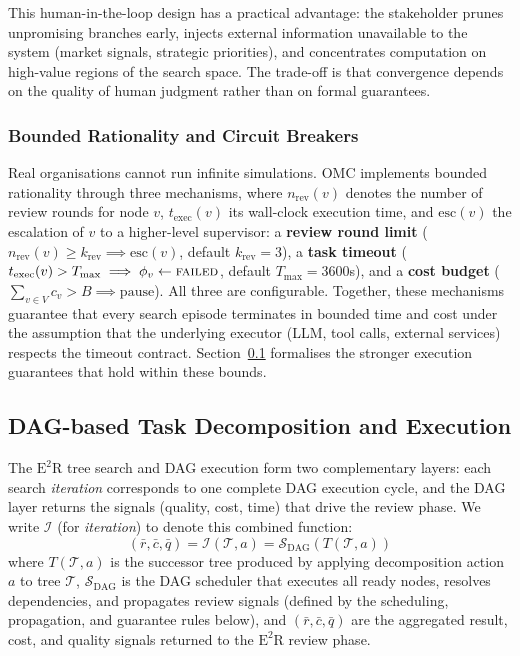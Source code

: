 \documentclass[11pt,a4paper]{article}
\begin{document}
This human-in-the-loop design has a practical advantage: the stakeholder prunes unpromising branches early, injects external information unavailable to the system (market signals, strategic priorities), and concentrates computation on high-value regions of the search space. The trade-off is that convergence depends on the quality of human judgment rather than on formal guarantees.

\subsubsection{Bounded Rationality and Circuit Breakers}

Real organisations cannot run infinite simulations.  OMC implements bounded rationality through three mechanisms, where $n_{\text{rev}}(v)$ denotes the number of review rounds for node $v$, $t_{\text{exec}}(v)$ its wall-clock execution time, and $\text{esc}(v)$ the escalation of $v$ to a higher-level supervisor: a \textbf{review round limit} ($n_{\text{rev}}(v) \geq k_{\text{rev}} \implies \text{esc}(v)$, default $k_{\text{rev}} = 3$), a \textbf{task timeout} ($t_{\text{exec}}(v) > T_{\max} \implies \phi_v \leftarrow \textsc{failed}$, default $T_{\max} = 3600$s), and a \textbf{cost budget} ($\sum_{v \in V} c_v > B \implies \text{pause}$).  All three are configurable.  Together, these mechanisms guarantee that every search episode terminates in bounded time and cost under the assumption that the underlying executor (LLM, tool calls, external services) respects the timeout contract.  Section~\ref{sec:dag} formalises the stronger execution guarantees that hold within these bounds.


\subsection{DAG-based Task Decomposition and Execution}
\label{sec:dag}

The $\text{E}^2$R tree search and DAG execution form two complementary layers: each search \emph{iteration} corresponds to one complete DAG execution cycle, and the DAG layer returns the signals (quality, cost, time) that drive the review phase.  We write $\mathcal{I}$ (for \emph{iteration}) to denote this combined function:
\begin{equation}
(\bar{r}, \bar{c}, \bar{q}) = \mathcal{I}(\mathcal{T}, a) = \mathcal{S}_{\text{DAG}}(T(\mathcal{T}, a))
\end{equation}
where $T(\mathcal{T}, a)$ is the successor tree produced by applying decomposition action $a$ to tree $\mathcal{T}$, $\mathcal{S}_{\text{DAG}}$ is the DAG scheduler that executes all ready nodes, resolves dependencies, and propagates review signals (defined by the scheduling, propagation, and guarantee rules below), and $(\bar{r}, \bar{c}, \bar{q})$ are the aggregated result, cost, and quality signals returned to the $\text{E}^2$R review phase.
\end{document}
